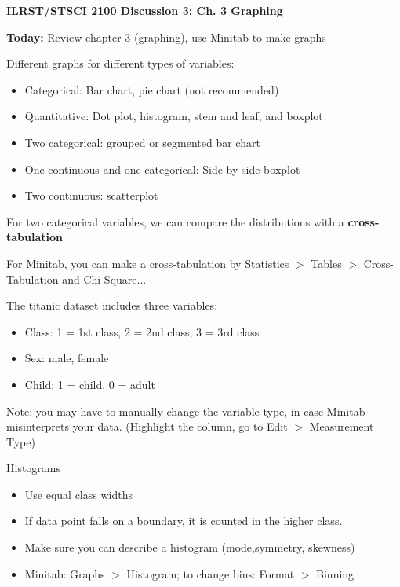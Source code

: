 \documentclass[12pt]{article}
\begin{document}
\begin{center}
\textbf{ILRST/STSCI 2100 Discussion 3: Ch. 3 Graphing}
\end{center}

\noindent \textbf{Today:} Review chapter 3 (graphing), use Minitab to make graphs

\noindent Different graphs for different types of variables:
\begin{itemize} [noitemsep, nolistsep, topsep=0pt]
\vspace{-\baselineskip}
\item Categorical: Bar chart, pie chart (not recommended)
\item Quantitative: Dot plot, histogram, stem and leaf, and boxplot 
\item Two categorical: grouped or segmented bar chart 
\item One continuous and one categorical: Side by side boxplot
\item Two continuous: scatterplot 
\end{itemize}

\noindent For two categorical variables, we can compare the distributions with a \textbf{cross-tabulation}  

\noindent For Minitab, you can make a cross-tabulation by Statistics $>$ Tables $>$ Cross-Tabulation and Chi Square...

\noindent The titanic dataset includes three variables:  
\begin{itemize}[noitemsep, nolistsep]
\vspace{-\baselineskip}
\item Class: 1 = 1st class, 2 = 2nd class, 3 = 3rd class
\item Sex: male, female
\item Child: 1 = child, 0 = adult
\end{itemize}

\noindent Note: you may have to manually change the variable type, in case Minitab misinterprets your data. (Highlight the column, go to Edit $>$ Measurement Type)

\noindent Histograms
\vspace{-\baselineskip}
\begin{itemize} [noitemsep, nolistsep, topsep=0pt]
\item Use equal class widths
\item If data point falls on a boundary, it is counted in the higher class. 
\item Make sure you can describe a histogram (mode,symmetry, skewness)
\item Minitab: Graphs $>$ Histogram; to change bins: Format $>$ Binning
\end{itemize}
\end{document}

